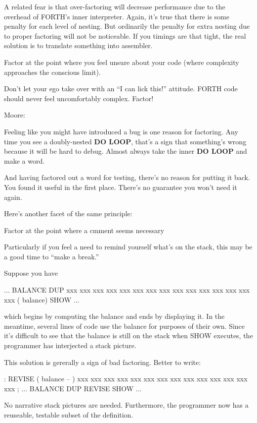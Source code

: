 A related fear is that over-factoring will decrease performance due to the overhead of FORTH's inner interpreter. Again, it's true that there is some penalty for each level of nesting. But ordinarily the penalty for extra nesting due to proper factoring will not be noticeable. If you timings are that tight, the real solution is to translate something into assembler.

\begin{tip}
Factor at the point where you feel unsure about your code (where complexity approaches the conscious limit).
\end{tip}
Don't let your ego take over with an ``I can lick this!'' attitude. FORTH code should never feel uncomfortably complex. Factor!

\bigskip
\blackline{2ex}
\noindent Moore:

\begin{tfquot}
Feeling like you might have introduced a bug is one reason for factoring. Any time you see a doubly-nested \textbf{DO LOOP}, that's a sign that something's wrong because it will be hard to debug. Almost always take the inner \textbf{DO LOOP} and make a word.

And having factored out a word for testing, there's no reason for putting it back. You found it useful in the first place. There's no guarantee you won't need it again.
\end{tfquot}
\blackline{1ex}
Here's another facet of the same principle:

\begin{tip}
Factor at the point where a cmment seems necessary
\end{tip}
Particularly if you feel a need to remind yourself what's on the stack, this may be a good time to ``make a break.''

Suppose you have

\begin{Code}
... BALANCE  DUP xxx xxx xxx xxx xxx xxx xxx xxx xxx
     xxx xxx xxx xxx xxx xxx   ( balance) SHOW  ...
\end{Code}
which begins by computing the balance and ends by displaying it. In the meantime, several lines of code use the balance for purposes of their own. Since it's difficult to see that the balance is still on the stack when SHOW executes, the programmer has interjected a stack picture.

This solution is gererally a sign of bad factoring. Better to write:
\begin{Code}
: REVISE  ( balance -- )  xxx xxx xxx xxx xxx xxx xxx
     xxx xxx xxx xxx xxx xxx xxx ;
... BALANCE  DUP REVISE  SHOW  ...
\end{Code}
No narrative stack pictures are needed. Furthermore, the programmer now has a reuseable, testable subset of the definition.

